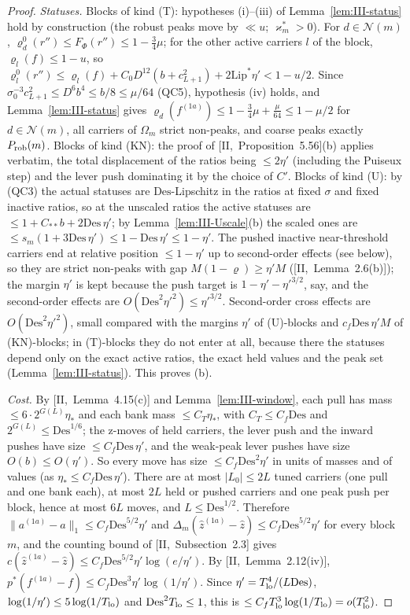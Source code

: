 \documentclass[10pt]{amsart}
\theoremstyle{definition}
\theoremstyle{remark}
\newcommand{\zh}{\hat z}
\begin{document}
\begin{proof}
\emph{Statuses.}  Blocks of kind (T): hypotheses (i)--(iii) of
Lemma~\ref{lem:III-status} hold by construction (the robust peaks move by
$\ll u$; $\varkappa^*_m>0$).  For $d\in\mathcal N(m)$, $\varrho^0_d(r'')\le F_\Phi(r'')\le
1-\frac34\mu$; for the other active carriers $l$ of the block, $\varrho_l(f)\le1-u$,
so $\varrho^0_l(r'')\le\varrho_l(f)+C_0D^{12}(b+c_{L+1}^2)+2\mathrm{Lip}^*\eta'<1-u/2$.
Since $\sigma_0^{-3}c_{L+1}^2\le D^6b^4\le b/8\le\mu/64$ (QC5), hypothesis (iv)
holds, and Lemma~\ref{lem:III-status} gives $\varrho_d(f^{(1a)})\le1-\frac34\mu+
\frac{\mu}{64}\le1-\mu/2$ for $d\in\mathcal N(m)$, all carriers of $\Omega_m$ strict
non-peaks, and coarse peaks exactly $P_{\rm rob}(m)$.  Blocks of kind (KN):
the proof of [II,~Proposition~5.56](b) applies verbatim, the total
displacement of the ratios being $\le2\eta'$ (including the Puiseux step)
and the lever push dominating it by the choice of $C'$.  Blocks of kind
(U): by (QC3) the actual statuses are $\mathrm{Des}$-Lipschitz in the ratios
at fixed $\sigma$ and fixed inactive ratios, so at the unscaled ratios the
active statuses are $\le1+C_{**}b+2\mathrm{Des}\,\eta'$; by
Lemma~\ref{lem:III-Uscale}(b) the scaled ones are $\le s_m(1+3\mathrm{Des}\,\eta')
\le1-\mathrm{Des}\,\eta'\le1-\eta'$.  The pushed inactive near-threshold carriers
end at relative position $\le1-\eta'$ up to second-order effects (see
below), so they are strict non-peaks with gap $M(1-\varrho)\ge\eta'M$
([II,~Lemma~2.6(b)]); the margin $\eta'$ is kept because the push target
is $1-\eta'-\eta'^{3/2}$, say, and the second-order effects are
$O(\mathrm{Des}^2\eta'^2)\le\eta'^{3/2}$.  Second-order cross
effects are $O(\mathrm{Des}^2\eta'^2)$, small compared with the margins $\eta'$
of (U)-blocks and $c_f\mathrm{Des}\,\eta'M$ of (KN)-blocks; in (T)-blocks they do
not enter at all, because there the statuses depend only on the exact
active ratios, the exact held values and the peak set
(Lemma~\ref{lem:III-status}).  This proves (b).

\emph{Cost.}  By [II,~Lemma~4.15(c)] and Lemma~\ref{lem:III-window}, each
pull has mass $\le6\cdot2^{G(L)}\eta_*$ and each bank mass $\le C_T\eta_*$,
with $C_T\le C_f\mathrm{Des}$ and $2^{G(L)}\le\mathrm{Des}^{1/6}$; the
z-moves of held carriers, the lever push and the inward pushes have size
$\le C_f\mathrm{Des}\,\eta'$, and the weak-peak lever pushes have size
$O(b)\le O(\eta')$.  So every move has size $\le C_f\mathrm{Des}^2\eta'$ in
units of masses and of values (as $\eta_*\le C_f\mathrm{Des}\,\eta'$).  There
are at most $|L_0|\le2L$ tuned carriers (one pull and one bank each), at
most $2L$ held or pushed carriers and one peak push per block, hence at most
$6L$ moves, and $L\le\mathrm{Des}^{1/2}$.  Therefore $\|a^{(1a)}-a\|_1\le
C_f\mathrm{Des}^{5/2}\eta'$ and $\Delta_m(\zh^{(1a)}-\zh)\le C_f
\mathrm{Des}^{5/2}\eta'$ for every block $m$, and the counting bound of
[II,~Subsection~2.3] gives $c(\zh^{(1a)}-\zh)\le C_f\mathrm{Des}^{5/2}\eta'
\log(e/\eta')$.  By [II,~Lemma~2.12(iv)], $p^*(f^{(1a)}-f)\le
C_f\mathrm{Des}^3\eta'\log(1/\eta')$.  Since $\eta'=T_{\rm lo}^4/(L\mathrm{Des})$,
$\log(1/\eta')\le5\log(1/T_{\rm lo})$ and $\mathrm{Des}^2T_{\rm lo}\le1$, this is
$\le C_fT_{\rm lo}^3\log(1/T_{\rm lo})=o(T_{\rm lo}^2)$.
\end{proof}
\end{document}
